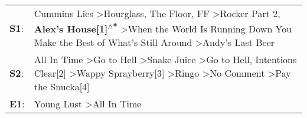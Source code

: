 \begin{supertabular}{p{0.03\textwidth}p{0.92\textwidth}}
 \textbf{S1}:  &              Cummins Lies\textsuperscript{} \textgreater \enspace Hourglass\textsuperscript{}, \enspace The Floor\textsuperscript{}, \enspace FF\textsuperscript{} \textgreater \enspace Rocker Part 2\textsuperscript{}, \enspace \textbf{Alex's House[1]\textsuperscript{$\wedge$*}} \textgreater \enspace When the World Is Running Down You Make the Best of What's Still Around\textsuperscript{} \textgreater \enspace Andy's Last Beer\textsuperscript{}  \enspace  \\
 \textbf{S2}:  &  All In Time\textsuperscript{} \textgreater \enspace Go to Hell\textsuperscript{} \textgreater \enspace Snake Juice\textsuperscript{} \textgreater \enspace Go to Hell\textsuperscript{}, \enspace Intentions Clear[2]\textsuperscript{} \textgreater \enspace Wappy Sprayberry[3]\textsuperscript{} \textgreater \enspace Ringo\textsuperscript{} \textgreater \enspace No Comment\textsuperscript{} \textgreater \enspace Pay the Snucka[4]\textsuperscript{}  \enspace  \\
 \textbf{E1}:  &                                                                                                                                                                                                                                                                                                                                                                                Young Lust\textsuperscript{} \textgreater \enspace All In Time\textsuperscript{}  \enspace  \\
\end{supertabular}
